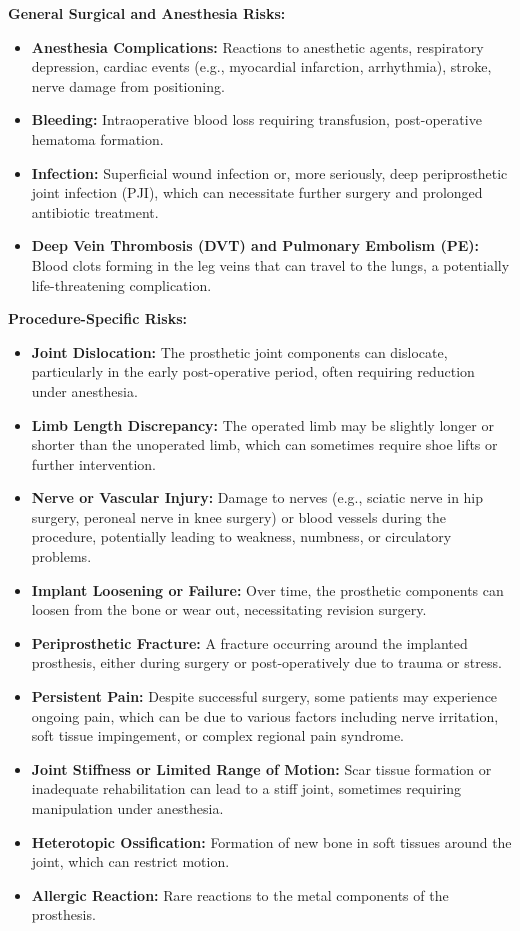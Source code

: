 \textbf{General Surgical and Anesthesia Risks:}
\begin{itemize}
  \item \textbf{Anesthesia Complications:} Reactions to anesthetic agents, respiratory depression, cardiac events (e.g., myocardial infarction, arrhythmia), stroke, nerve damage from positioning.
  \item \textbf{Bleeding:} Intraoperative blood loss requiring transfusion, post-operative hematoma formation.
  \item \textbf{Infection:} Superficial wound infection or, more seriously, deep periprosthetic joint infection (PJI), which can necessitate further surgery and prolonged antibiotic treatment.
  \item \textbf{Deep Vein Thrombosis (DVT) and Pulmonary Embolism (PE):} Blood clots forming in the leg veins that can travel to the lungs, a potentially life-threatening complication.
\end{itemize}

\textbf{Procedure-Specific Risks:}
\begin{itemize}
  \item \textbf{Joint Dislocation:} The prosthetic joint components can dislocate, particularly in the early post-operative period, often requiring reduction under anesthesia.
  \item \textbf{Limb Length Discrepancy:} The operated limb may be slightly longer or shorter than the unoperated limb, which can sometimes require shoe lifts or further intervention.
  \item \textbf{Nerve or Vascular Injury:} Damage to nerves (e.g., sciatic nerve in hip surgery, peroneal nerve in knee surgery) or blood vessels during the procedure, potentially leading to weakness, numbness, or circulatory problems.
  \item \textbf{Implant Loosening or Failure:} Over time, the prosthetic components can loosen from the bone or wear out, necessitating revision surgery.
  \item \textbf{Periprosthetic Fracture:} A fracture occurring around the implanted prosthesis, either during surgery or post-operatively due to trauma or stress.
  \item \textbf{Persistent Pain:} Despite successful surgery, some patients may experience ongoing pain, which can be due to various factors including nerve irritation, soft tissue impingement, or complex regional pain syndrome.
  \item \textbf{Joint Stiffness or Limited Range of Motion:} Scar tissue formation or inadequate rehabilitation can lead to a stiff joint, sometimes requiring manipulation under anesthesia.
  \item \textbf{Heterotopic Ossification:} Formation of new bone in soft tissues around the joint, which can restrict motion.
  \item \textbf{Allergic Reaction:} Rare reactions to the metal components of the prosthesis.
\end{itemize}

